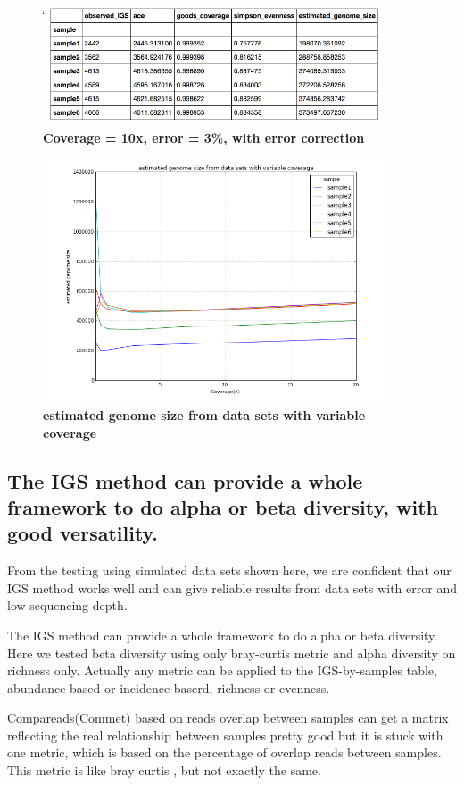 \begin{figure}[!ht]
 \centerline{\includegraphics[width=4in]{./figures/IGS_table_alpha1_10x_3_e.png}}
\caption{\bf Coverage = 10x, error = 3\%, with error correction}
\label{fig:IGS_table_alpha1_10x_3_e}
\end{figure}

\begin{figure}[!ht]
 \centerline{\includegraphics[width=4in]{./figures/IGS_figure_test_alpha.png}}
\caption{\bf estimated genome size from data sets with variable coverage}
\label{fig:IGS_figure_test_alpha}
\end{figure}


\subsection{The IGS method can provide a whole framework to do alpha or beta diversity, with good versatility.}

From the testing using simulated data sets shown here, we are confident that our IGS method works well and can give reliable results from data sets with error and low sequencing depth.

The IGS method can provide a whole framework to do alpha or beta diversity. Here we tested beta diversity using only bray-curtis metric and alpha diversity on richness only. Actually any metric can be applied to the IGS-by-samples table, abundance-based or incidence-baserd, richness or evenness.

Compareads(Commet) based on reads overlap between samples can get a matrix reflecting the real relationship between samples pretty good but it is stuck with one metric, which is based on the percentage of overlap reads between samples. This metric is like bray curtis , but not exactly the same.


